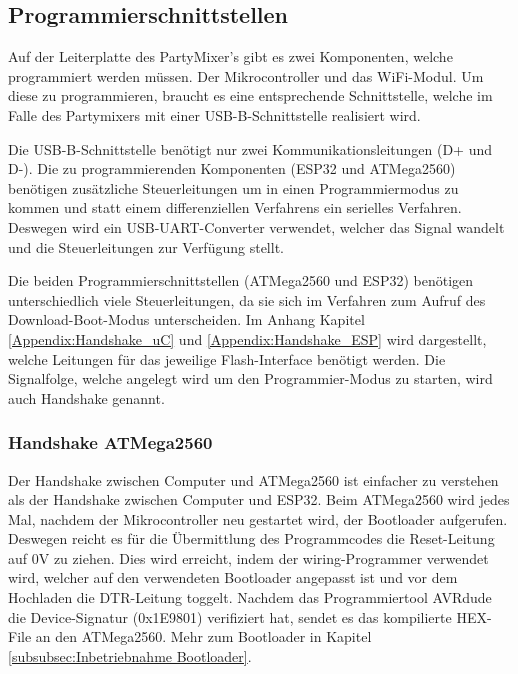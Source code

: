 \clearpage
\subsection{Programmierschnittstellen}
\label{subsec:Programmierschnittstellen}

Auf der Leiterplatte des PartyMixer's gibt es zwei Komponenten, welche programmiert werden müssen. Der Mikrocontroller und das WiFi-Modul. Um diese zu programmieren, braucht es eine entsprechende Schnittstelle, welche im Falle des Partymixers mit einer USB-B-Schnittstelle realisiert wird.

Die USB-B-Schnittstelle benötigt nur zwei Kommunikationsleitungen (D+ und D-). Die zu programmierenden Komponenten (ESP32 und ATMega2560) benötigen zusätzliche Steuerleitungen um in einen Programmiermodus zu kommen und statt einem differenziellen Verfahrens ein serielles Verfahren. Deswegen wird ein USB-UART-Converter verwendet, welcher das Signal wandelt und die Steuerleitungen zur Verfügung stellt. \cite{zenkner_usb_2014}

Die beiden Programmierschnittstellen (ATMega2560 und ESP32) benötigen unterschiedlich viele Steuerleitungen, da sie sich im Verfahren zum Aufruf des Download-Boot-Modus unterscheiden. Im Anhang Kapitel \ref{Appendix:Handshake_uC} und \ref{Appendix:Handshake_ESP} wird dargestellt, welche Leitungen für das jeweilige Flash-Interface benötigt werden. Die Signalfolge, welche angelegt wird um den Programmier-Modus zu starten, wird auch Handshake genannt.

\subsubsection{Handshake ATMega2560}\label{subsubsec:Handshake_ATMega2560}

Der Handshake zwischen Computer und ATMega2560 ist einfacher zu verstehen als der Handshake zwischen Computer und ESP32. Beim ATMega2560 wird jedes Mal, nachdem der Mikrocontroller neu gestartet wird, der Bootloader aufgerufen. Deswegen reicht es für die Übermittlung des Programmcodes die Reset-Leitung auf 0V zu ziehen. Dies wird erreicht, indem der wiring-Programmer verwendet wird, welcher auf den verwendeten Bootloader angepasst ist und vor dem Hochladen die DTR-Leitung toggelt. Nachdem das Programmiertool AVRdude die Device-Signatur (0x1E9801) verifiziert hat, sendet es das kompilierte HEX-File an den ATMega2560. Mehr zum Bootloader in Kapitel \ref{subsubsec:Inbetriebnahme Bootloader}.

